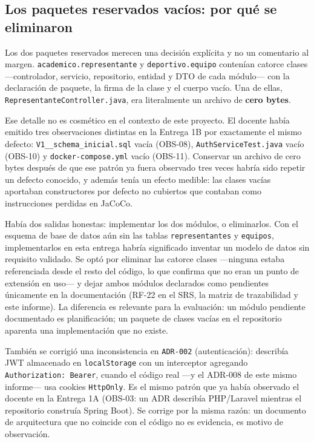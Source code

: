 \documentclass[11pt,a4paper]{article}
\begin{document}
\subsection{Los paquetes reservados vacíos: por qué se eliminaron}

Los dos paquetes reservados merecen una decisión explícita y no un
comentario al margen. \texttt{academico.representante} y
\texttt{deportivo.equipo} contenían catorce clases —controlador, servicio,
repositorio, entidad y DTO de cada módulo— con la declaración de paquete,
la firma de la clase y el cuerpo vacío. Una de ellas,
\texttt{RepresentanteController.java}, era literalmente un archivo de
\textbf{cero bytes}.

Ese detalle no es cosmético en el contexto de este proyecto. El docente
había emitido tres observaciones distintas en la Entrega 1B por exactamente
el mismo defecto: \texttt{V1\_\_schema\_inicial.sql} vacía (OBS-08),
\texttt{AuthServiceTest.java} vacío (OBS-10) y \texttt{docker-compose.yml}
vacío (OBS-11). Conservar un archivo de cero bytes después de que ese
patrón ya fuera observado tres veces habría sido repetir un defecto
conocido, y además tenía un efecto medible: las clases vacías aportaban
constructores por defecto no cubiertos que contaban como instrucciones
perdidas en JaCoCo.

Había dos salidas honestas: implementar los dos módulos, o eliminarlos. Con
el esquema de base de datos aún sin las tablas \texttt{representantes} y
\texttt{equipos}, implementarlos en esta entrega habría significado
inventar un modelo de datos sin requisito validado. Se optó por eliminar
las catorce clases —ninguna estaba referenciada desde el resto del
código, lo que confirma que no eran un punto de extensión en uso— y dejar
ambos módulos declarados como pendientes únicamente en la documentación
(RF-22 en el SRS, la matriz de trazabilidad y este informe). La diferencia
es relevante para la evaluación: un módulo pendiente documentado es
planificación; un paquete de clases vacías en el repositorio aparenta una
implementación que no existe.

También se corrigió una inconsistencia en \texttt{ADR-002} (autenticación):
describía JWT almacenado en \texttt{localStorage} con un interceptor
agregando \texttt{Authorization: Bearer}, cuando el código real —y el
ADR-008 de este mismo informe— usa cookies \texttt{HttpOnly}. Es el mismo
patrón que ya había observado el docente en la Entrega 1A (OBS-03: un ADR
describía PHP/Laravel mientras el repositorio construía Spring Boot). Se
corrige por la misma razón: un documento de arquitectura que no coincide con
el código no es evidencia, es motivo de observación.
\end{document}
